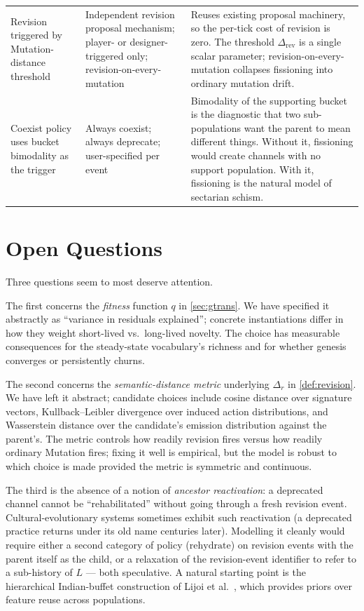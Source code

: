 \documentclass[journal,onecolumn,11pt]{IEEEtran}
\theoremstyle{definition}
\begin{document}
\begin{longtable}{L{0.25\textwidth} L{0.25\textwidth} L{0.40\textwidth}}
Revision triggered by Mutation-distance threshold
& Independent revision proposal mechanism; player- or designer-triggered only; revision-on-every-mutation
& Reuses existing proposal machinery, so the per-tick cost of revision is zero. The threshold $\Delta_{\mathrm{rev}}$ is a single scalar parameter; revision-on-every-mutation collapses fissioning into ordinary mutation drift. \\
Coexist policy uses bucket bimodality as the trigger
& Always coexist; always deprecate; user-specified per event
& Bimodality of the supporting bucket is the diagnostic that two sub-populations want the parent to mean different things. Without it, fissioning would create channels with no support population. With it, fissioning is the natural model of sectarian schism. \\
\end{longtable}

\section{Open Questions}
\label{sec:open}

Three questions seem to most deserve attention.

The first concerns the \emph{fitness} function $q$ in \cref{sec:gtrans}. We have specified it abstractly as ``variance in residuals explained''; concrete instantiations differ in how they weight short-lived vs.\ long-lived novelty. The choice has measurable consequences for the steady-state vocabulary's richness and for whether genesis converges or persistently churns.

The second concerns the \emph{semantic-distance metric} underlying $\Delta_r$ in \cref{def:revision}. We have left it abstract; candidate choices include cosine distance over signature vectors, Kullback--Leibler divergence over induced action distributions, and Wasserstein distance over the candidate's emission distribution against the parent's. The metric controls how readily revision fires versus how readily ordinary Mutation fires; fixing it well is empirical, but the model is robust to which choice is made provided the metric is symmetric and continuous.

The third is the absence of a notion of \emph{ancestor reactivation}: a deprecated channel cannot be ``rehabilitated'' without going through a fresh revision event. Cultural-evolutionary systems sometimes exhibit such reactivation (a deprecated practice returns under its old name centuries later). Modelling it cleanly would require either a second category of policy ($\mathrm{rehydrate}$) on revision events with the parent itself as the child, or a relaxation of the revision-event identifier to refer to a sub-history of $L$ --- both speculative. A natural starting point is the hierarchical Indian-buffet construction of Lijoi et al.~\cite{lijoi2023}, which provides priors over feature reuse across populations.
\end{document}
